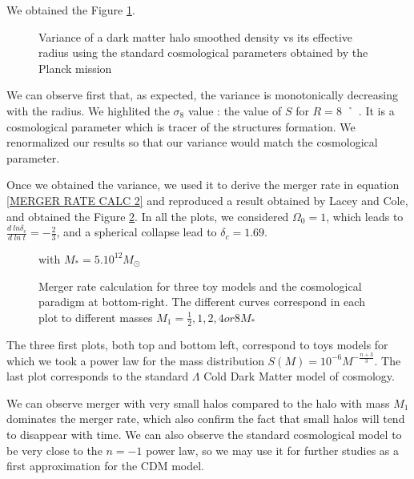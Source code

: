 We obtained the Figure \ref{Variance Figure}.

\begin{figure}
\caption{Variance of a dark matter halo smoothed density vs its effective radius using the standard cosmological parameters obtained by the Planck mission}
\label{Variance Figure}
\end{figure}

We can observe first that, as expected, the variance is monotonically decreasing with the radius. We highlited the $\sigma_8$ value : the value of $S$ for $R =$\SI{8}{\per \h\mega\parsec}. It is a cosmological parameter which is tracer of the structures formation. We renormalized our results so that our variance would match the cosmological parameter.

Once we obtained the variance, we used it to derive the merger rate in equation \ref{MERGER RATE CALC 2} and reproduced a result obtained by Lacey and Cole\cite{LaC}, and obtained the Figure \ref{Merger Rate}. In all the plots, we considered $\Omega_0 = 1$, which leads to $\frac{d \ ln \delta_c}{d \ ln \ t} = -\frac{2}{3}$, and a spherical collapse lead to $\delta_c = 1.69$.

\begin{figure}
\caption{Merger rate calculation for three toy models and the cosmological paradigm at bottom-right. The different curves correspond in each plot to different masses $M_1 = \frac{1}{2}, 1, 2, 4 or 8 M_\ast$} with $M_\ast = 5.10^{12} M_\odot$
\label{Merger Rate}
\end{figure}


The three first plots, both top and bottom left, correspond to toys models for which we took a power law for the mass distribution $S(M) = 10^{-6} M^{-\frac{n+3}{3}}$.
The last plot corresponds to the standard $\Lambda$ Cold Dark Matter model of cosmology.

We can observe merger with very small halos compared to the halo with mass $M_1$ dominates the merger rate, which also confirm the fact that small halos will tend to disappear with time.
We can also observe the standard cosmological model to be very close to the $n=-1$ power law, so we may use it for further studies as a first approximation for the CDM model.

